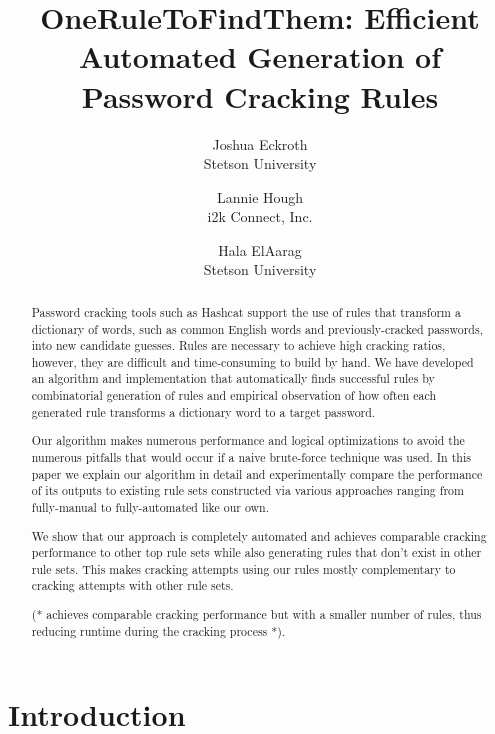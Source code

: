 \documentclass[letterpaper,twocolumn,10pt]{article}
\begin{document}
\date{}

\title{\Large \bf OneRuleToFindThem: Efficient Automated Generation of Password Cracking Rules}

\author{
{\rm Joshua Eckroth}\\
Stetson University
\and
{\rm Lannie Hough}\\
i2k Connect, Inc.
\and
{\rm Hala ElAarag}\\
Stetson University
}

\maketitle

\begin{abstract}
Password cracking tools such as Hashcat support the use of rules that transform
a dictionary of words, such as common English words and previously-cracked
passwords, into new candidate guesses. Rules are necessary to achieve high
cracking ratios, however, they are difficult and time-consuming to build by hand. We have
developed an algorithm and implementation that automatically finds successful
rules by combinatorial generation of rules and empirical observation of how
often each generated rule transforms a dictionary word to a target password.

Our algorithm makes numerous performance and logical optimizations to avoid the
numerous pitfalls that would occur if a naive brute-force technique was used.  In this
paper we explain our algorithm in detail and experimentally compare the performance of
its outputs to existing rule sets constructed via various approaches ranging from
fully-manual to fully-automated like our own.

We show that our approach is completely automated and achieves comparable
cracking performance to other top rule sets while also generating rules
that don't exist in other rule sets. This makes cracking attempts using our
rules mostly complementary to cracking attempts with other rule sets.

(* achieves comparable cracking performance but with a smaller number of rules,
thus reducing runtime during the cracking process *).
\end{abstract}


\section{Introduction}
\end{document}
